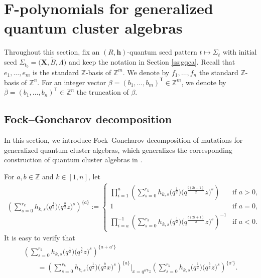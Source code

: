 \documentclass[10pt,a4paper]{amsart}
\newcommand{\Z}{\mathbb{Z}}
\numberwithin{equation}{section}
\begin{document}
\section[F-polynomials for generalized quantum cluster algebras]{$\boldsymbol{F}$-polynomials for generalized quantum cluster algebras}

Throughout this section, fix an $(R,\mathbf{h})$-quantum seed pattern $t\mapsto \Sigma_t$ with initial seed $\Sigma_{t_0}=\bigl(\mathbf{X},\tilde{B},\Lambda\bigr)$ and keep the notation in Section \ref{ss:gqca}. Recall that $e_1,\dots, e_m$ is the standard $\mathbb{Z}$-basis of $\mathbb{Z}^m$. We denote by $f_1,\dots, f_n$ the standard $\mathbb{Z}$-basis of $\mathbb{Z}^n$.
For an integer vector $\beta=(b_1,\dots, b_m)^{\mathsf T}\in \Z^m$, we denote by $\overline{\beta}=(b_1,\dots, b_n)^{\mathsf T}\in \Z^n$ the truncation of $\beta$.
\subsection{Fock--Goncharov decomposition}\label{s:FG-decom-GQCA}
In this section, we introduce Fock--Goncharov decomposition of mutations for generalized quantum cluster algebras, which generalizes the corresponding construction of quantum cluster algebras in \cite{fock2009,Keller2012}.


For $a,b\in\mathbb{Z}$ and $k\in[1,n]$, let
\begin{align*}
 \left(\sum\limits^{r_{k}}_{s=0}h_{k,s}\bigl(q^{\frac{1}{2}}\bigr)\bigl(q^{\frac{b}{2}}z\bigr)^{s}\right)^{\{a\}}:=
 \begin{cases}\displaystyle\prod\limits_{i=1}^{a}
 \left(\sum\limits^{r_{k}}_{s=0}h_{k,s}\bigl(q^{\frac{1}{2}}\bigr)\bigl(q^{\frac{b(2i-1)}{2}}z\bigr)^{s}\right)&\text{if } a>0,\\
 1&\text{if }a=0,\\
 \displaystyle \prod\limits_{i=a}^{-1}\left(\sum\limits^{r_{k}}_{s=0}h_{k,s}\bigl(q^{\frac{1}{2}}\bigr)\bigl(q^{\frac{b(2i+1)}{2}}z\bigr)^{s}\right)^{-1}&\text{if } a<0.
 \end{cases}
\end{align*}
It is easy to verify that
\begin{gather}
 \left(\sum\limits^{r_{k}}_{s=0}h_{k,s}\bigl(q^{\frac{1}{2}}\bigr)\bigl(q^{\frac{b}{2}}z\bigr)^{s}\right)^{\{a+a'\}}\nonumber\\
 \qquad=\left(\sum\limits^{r_{k}}_{s=0}h_{k,s}\bigl(q^{\frac{1}{2}}\bigr)\bigl(q^{\frac{b}{2}}x\bigr)^{s}\right)^{\{a\}}\bigg|_{x=q^{a'b}z}
 \left(\sum\limits^{r_{k}}_{s=0}h_{k,s}\bigl(q^{\frac{1}{2}}\bigr)\bigl(q^{\frac{b}{2}}z\bigr)^{s}\right)^{\{a'\}}.\label{eq:FG-decom}
\end{gather}
\end{document}
